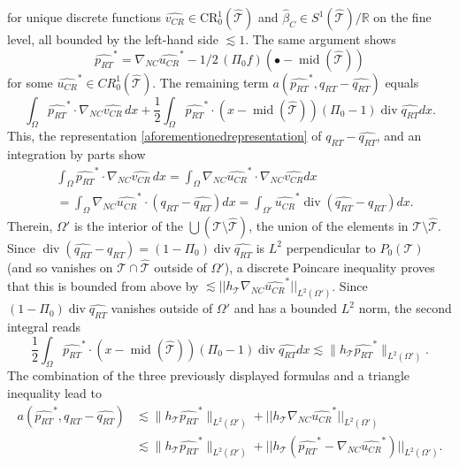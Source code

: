 \documentclass{siamltex1213}
\begin{document}
for unique discrete functions $\widehat{v_{CR}}\in \mathrm{CR}^1_0({\hat{\mathcal{T}}})$ and $\widehat \beta_C \in S^1({\hat{\mathcal{T}}})/\mathbb R$ 
on the fine level, all   bounded by the left-hand side  $\lesssim 1$. 
The same argument shows   
\begin{equation}\label{marinipur}
	{\widehat{p_{RT}}}^*= \nabla_{NC} {\widehat{u_{CR}}}^* - 1/2\, \left(\Pi_0 f\right) (\bullet -{\operatorname{mid}({\hat{\mathcal{T}}})})
\end{equation}
for some ${\widehat{u_{CR}}}^*\in CR^1_0({\hat{\mathcal{T}}})$.
The remaining term $a({\widehat{p_{RT}}}^*,{q_{RT}}-{\widehat{q_{RT}}})$  equals 
\[
\int_\Omega {\widehat{p_{RT}}}^*\cdot \nabla_{NC} \widehat{v_{CR}} \, dx+
\frac12 \int_\Omega{\widehat{p_{RT}}}^*  \cdot (x -{\operatorname{mid}({\hat{\mathcal{T}}})}) (\Pi_0-1)\operatorname{div} {\widehat{q_{RT}}}   dx.
\]
This, the representation \eqref{aforementionedrepresentation} of $ {q_{RT}}-{\widehat{q_{RT}}}$, and an
integration by parts show 
\begin{align*}
& \int_\Omega {\widehat{p_{RT}}}^*\cdot \nabla_{NC} \widehat{v_{CR}} \, dx
	  = \int_\Omega \nabla_{NC} {\widehat{u_{CR}}}^*\cdot  \nabla_{NC} {\widehat{v_{CR}}}  dx \\
	&  = \int_\Omega \nabla_{NC} {\widehat{u_{CR}}}^*\cdot( {q_{RT}}-{\widehat{q_{RT}}} ) dx 
	 =\int_{\Omega'}   {\widehat{u_{CR}}}^*  \operatorname{div} ( {\widehat{q_{RT}}}-{q_{RT}} ) dx.
\end{align*}
Therein, $\Omega'$ is the interior of the $\bigcup ({\mathcal{T}}\setminus{\hat{\mathcal{T}}})$, the union of the elements in ${\mathcal{T}}\setminus{\hat{\mathcal{T}}}$.
Since $ \operatorname{div} ( {\widehat{q_{RT}}}-{q_{RT}} )=(1-\Pi_0)\operatorname{div} {\widehat{q_{RT}}}$ is $L^2$ perpendicular to $P_0({\mathcal{T}})$ (and so
vanishes on ${\mathcal{T}}\cap{\hat{\mathcal{T}}}$ outside of $\Omega'$), 
a discrete Poincare inequality proves
that this is bounded from above by  
$\lesssim ||  h_{\mathcal{T}}   \nabla_{NC}   {\widehat{u_{CR}}}^*  ||_{L^2(\Omega')} $.
Since  $(1-\Pi_0)\operatorname{div} {\widehat{q_{RT}}}$ vanishes outside of $\Omega'$ and has a
bounded $L^2$ norm,  the second integral reads
\[
\frac12 \int_\Omega{\widehat{p_{RT}}}^*  \cdot (x -{\operatorname{mid}({\hat{\mathcal{T}}})}) (\Pi_0-1)\operatorname{div} {\widehat{q_{RT}}}   dx
\lesssim \|  h_{\mathcal{T}} {\widehat{p_{RT}}}^* \|_{L^2(\Omega')}.
\]
The combination of the three previously displayed formulas and a triangle inequality lead to
\begin{align*}
a({\widehat{p_{RT}}}^*,{q_{RT}}-{\widehat{q_{RT}}})&\lesssim  \|  h_{\mathcal{T}}  {\widehat{p_{RT}}}^* \|_{L^2(\Omega')}
+ ||  h_{\mathcal{T}}   \nabla_{NC}   {\widehat{u_{CR}}}^*  ||_{L^2(\Omega')} \\
&\lesssim  \|  h_{\mathcal{T}}  {\widehat{p_{RT}}}^* \|_{L^2(\Omega')}
+ ||  h_{\mathcal{T}}  (  {\widehat{p_{RT}}}^*- \nabla_{NC}   {\widehat{u_{CR}}}^* )  ||_{L^2(\Omega')}.
\end{align*}
\end{document}
